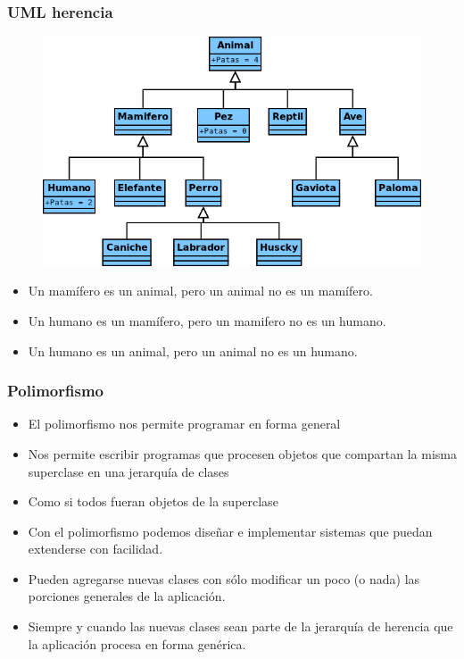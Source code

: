 \documentclass{beamer}
\begin{document}
\begin{frame}
\frametitle{UML herencia}
\begin{figure}
\includegraphics[scale=0.3]{imagenes/herencia1.png}
\end{figure}
\begin{itemize}[<+->]
\item Un mamífero es un animal, pero un animal no es un mamífero.
\item Un humano es un mamífero, pero un mamifero no es un humano.
\item Un humano es un animal, pero un animal no es un humano.
\end{itemize}
\end{frame}


\begin{frame}[fragile]
\frametitle{Polimorfismo}
\begin{itemize}[<+->]
\item El polimorfismo nos permite programar en forma general
\item Nos permite escribir programas que procesen objetos que compartan la misma superclase en una jerarquía de clases
\item Como si todos fueran objetos de la superclase
\item Con el polimorfismo podemos diseñar e implementar sistemas que puedan extenderse con facilidad.
\item Pueden agregarse nuevas clases con sólo modificar un poco (o nada) las porciones generales de la aplicación.
\item Siempre y cuando las nuevas clases sean parte de la jerarquía de herencia que la aplicación procesa en forma genérica.
\end{itemize}
\end{frame}
\end{document}
